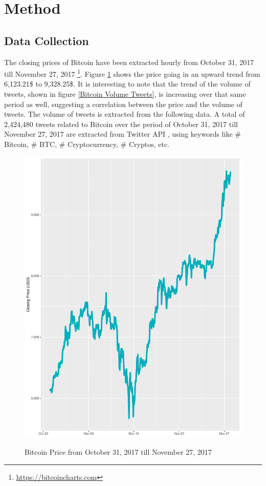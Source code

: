 \documentclass[conference]{IEEEtran}
\begin{document}
\section{Method}

\subsection{Data Collection}
\par The closing prices of Bitcoin have been extracted hourly from October 31, 2017 till November 27, 2017 \footnote{\url{https://bitcoincharts.com}}. Figure \ref{Bitcoin Price} shows the price going in an upward trend from 6,123.21\$ to 9,328.25\$. It is interesting to note that the trend of the volume of tweets, shown in figure \ref{Bitcoin Volume Tweets}, is increasing over that same period as well, suggesting a correlation between the price and the volume of tweets. The volume of tweets is extracted from the following data. A total of 2,424,480 tweets related to Bitcoin over the period  of October 31, 2017 till November 27, 2017 are extracted from Twitter API \cite{Twitter API}, using keywords like \# Bitcoin, \# BTC, \# Cryptocurrency, \# Cryptos, etc. 

\begin{minipage}{\linewidth}
\begin{figure}[H]
\centering
\caption{Bitcoin Price from October 31, 2017 till November 27, 2017} 
\includegraphics[scale=0.3]{Graphs/BitcoinPriceChart.pdf}
\label{Bitcoin Price} 
\end{figure}
\end{minipage}
\end{document}
